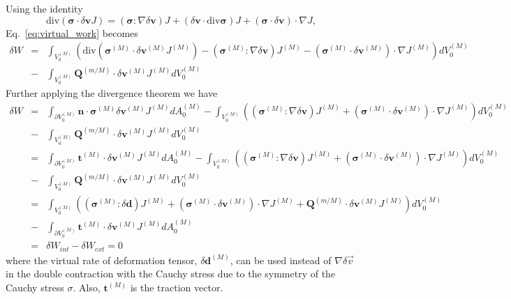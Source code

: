 Using the identity
%
\begin{equation}
\text{div}(\pmb{\sigma}\cdot\delta\pmb{v} J) =  (\pmb{\sigma}:\nabla\delta\pmb{v})J + (\delta \pmb{v} \cdot \text{div}\pmb{\sigma})J + (\pmb{\sigma} \cdot \delta\pmb{v})\cdot \nabla J,
\end{equation}
%
Eq.\ \eqref{eq:virtual_work} becomes
%
\begin{eqnarray}
\delta W &=& \int_{V_0^{(M)}} \left(\text{div}(\pmb{\sigma}^{(M)} \cdot \delta\pmb{v}^{(M)} J^{(M)}) - (\pmb{\sigma}^{(M)}:\nabla \delta \pmb{v}) J^{(M)} - (\pmb{\sigma}^{(M)}\cdot \delta \pmb{v}^{(M)})\cdot \nabla J^{(M)} \right)dV_0^{(M)} \nonumber\\
%
&-& \int_{V_0^{(M)}} \pmb{Q}^{(m/M)} \cdot \delta \pmb{v}^{(M)}J^{(M)} dV_0^{(M)} 
%
\end{eqnarray}
%
Further applying the divergence theorem we have
%
\begin{eqnarray}
\delta W &=& \int_{\partial V_0^{(M)}} \pmb{n} \cdot \pmb{\sigma}^{(M)} \delta\pmb{v}^{(M)} J^{(M)} dA_0^{(M)} - \int_{V_0^{(M)}} \left((\pmb{\sigma}^{(M)}:\nabla \delta \pmb{v}) J^{(M)} + (\pmb{\sigma}^{(M)} \cdot \delta \pmb{v}^{(M)})\cdot \nabla J^{(M)} \right)dV_0^{(M)} \nonumber\\
%
&-& \int_{V_0^{(M)}} \pmb{Q}^{(m/M)} \cdot \delta \pmb{v}^{(M)}J^{(M)} dV_0^{(M)} \nonumber\\
%
&=& \int_{\partial V_0^{(M)}} \pmb{t}^{(M)} \cdot \delta\pmb{v}^{(M)} J^{(M)} dA_0^{(M)} - \int_{V_0^{(M)}} \left((\pmb{\sigma}^{(M)}:\nabla \delta \pmb{v}) J^{(M)} + (\pmb{\sigma}^{(M)} \cdot \delta \pmb{v}^{(M)})\cdot \nabla J^{(M)} \right)dV_0^{(M)} \nonumber\\
%
&-& \int_{V_0^{(M)}} \pmb{Q}^{(m/M)} \cdot \delta \pmb{v}^{(M)}J^{(M)} dV_0^{(M)} \nonumber\\
&=& \int_{V_0^{(M)}} \left((\pmb{\sigma}^{(M)}:\delta \pmb{d}) J^{(M)} + (\pmb{\sigma}^{(M)}\cdot\delta \pmb{v}^{(M)})\cdot \nabla J^{(M)} +\pmb{Q}^{(m/M)} \cdot \delta \pmb{v}^{(M)}J^{(M)}\right)dV_0^{(M)} \nonumber\\
%
&-& \int_{\partial V_0^{(M)}} \pmb{t}^{(M)} \cdot \delta\pmb{v}^{(M)} J^{(M)} dA_0^{(M)} \nonumber\\
%
&=& \delta W_{int} - \delta W_{ext} = 0
\label{eq:virtual_work_final}
\end{eqnarray}
%
where the virtual rate of deformation tensor, $\delta \pmb{d}^{(M)}$, can be used instead of $\nabla \delta \vec{v}$ in the double contraction with the Cauchy stress due to the symmetry of the Cauchy stress $\sigma$. Also, $\pmb{t}^{(M)}$ is the traction vector.

